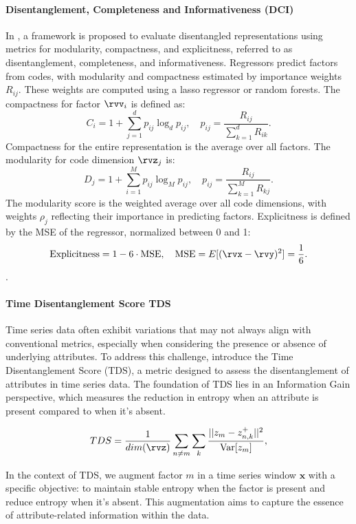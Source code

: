 \documentclass{article} %
\theoremstyle{plain}
\theoremstyle{definition}
\theoremstyle{remark}
\numberwithin{equation}{section}
\begin{document}
\paragraph{Disentanglement, Completeness and Informativeness (DCI)}
In \citep{carbonneau_measuring_2022}, a framework is proposed to evaluate disentangled representations using metrics for modularity, compactness, and explicitness, referred to as disentanglement, completeness, and informativeness. Regressors predict factors from codes, with modularity and compactness estimated by importance weights \(R_{ij}\). These weights are computed using a lasso regressor or random forests. The compactness for factor \( \rvv_i \) is defined as:
\[
C_i = 1 + \sum_{j=1}^d p_{ij} \log_d p_{ij}, \quad p_{ij} = \frac{R_{ij}}{\sum_{k=1}^d R_{ik}}.
\]
Compactness for the entire representation is the average over all factors. The modularity for code dimension \( \rvz_j \) is:
\[
D_j = 1 + \sum_{i=1}^M p_{ij} \log_M p_{ij}, \quad p_{ij} = \frac{R_{ij}}{\sum_{k=1}^M R_{kj}}.
\]
The modularity score is the weighted average over all code dimensions, with weights \( \rho_j \) reflecting their importance in predicting factors. Explicitness is defined by the MSE of the regressor, normalized between 0 and 1:
\[
\text{Explicitness} = 1 - 6 \cdot \text{MSE}, \quad \text{MSE} = E[(\rvx - \rvy)^2] = \frac{1}{6}.
\].
\paragraph{Time Disentanglement Score TDS} Time series data often exhibit variations that may not always align with conventional metrics, especially when considering the presence or absence of underlying attributes. To address this challenge, \citep{oublal2024disentangling} introduce the Time Disentanglement Score (TDS), a metric designed to assess the disentanglement of attributes in time series data. The foundation of TDS lies in an Information Gain perspective, which measures the reduction in entropy when an attribute is present compared to when it's absent.

\begin{equation}
    TDS = \frac{1}{dim(\rvz)}\sum_{n\neq m}\sum_{k} \frac{||z_{m} - z^{+}_{n,k}||^{2}}{\mathrm{Var}[z_{m}]},
\end{equation}
\vspace{-0.3cm}

In the context of TDS, we augment factor $m$ in a time series window $\mathbf{x}$ with a specific objective: to maintain stable entropy when the factor is present and reduce entropy when it's absent. This augmentation aims to capture the essence of attribute-related information within the data.
\end{document}
